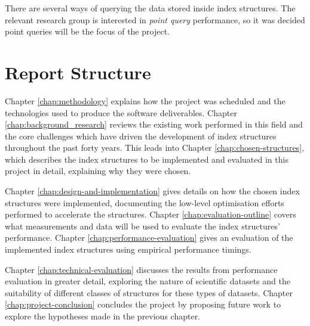 There are several ways of querying the data stored inside index structures. The relevant research group is interested in \textit{point query} performance, so it was decided point queries will be the focus of the project.

\section{Report Structure}

Chapter \ref{chap:methodology} explains how the project was scheduled and the technologies used to produce the software deliverables. Chapter \ref{chap:background_research} reviews the existing work performed in this field and the core challenges which have driven the development of index structures throughout the past forty years. This leads into Chapter \ref{chap:chosen-structures}, which describes the index structures to be implemented and evaluated in this project in detail, explaining why they were chosen.

Chapter \ref{chap:design-and-implementation} gives details on how the chosen index structures were implemented, documenting the low-level optimisation efforts performed to accelerate the structures. Chapter \ref{chap:evaluation-outline} covers what measurements and data will be used to evaluate the index structures' performance. Chapter \ref{chap:performance-evaluation} gives an evaluation of the implemented index structures using empirical performance timings. 

Chapter \ref{chap:technical-evaluation} discusses the results from performance evaluation in greater detail, exploring the nature of scientific datasets and the suitability of different classes of structures for these types of datasets. Chapter \ref{chap:project-conclusion} concludes the project by proposing future work to explore the hypotheses made in the previous chapter.